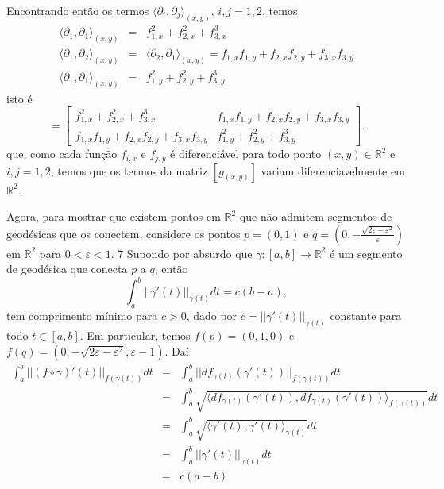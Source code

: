 \documentclass[twoside,openright,titlepage,numbers=noenddot,headinclude,  lineheaders footinclude=true,cleardoublepage=empty,BCOR=5mm,paper=a4,fontsize=12pt ]{scrbook}
\newcommand{\R}{\mathbb R}
\begin{document}
Encontrando então os termos $\langle \partial_i,\partial_j\rangle_{(x,y)}$, $i,j=1,2$, temos 
\begin{eqnarray*}
    \langle \partial_1,\partial_1\rangle_{(x,y)} &=& f_{1,x}^2 + f_{2,x}^2 + f_{3,x}^3\\
    \langle \partial_1,\partial_2\rangle_{(x,y)} &=& \langle \partial_2,\partial_1\rangle_{(x,y)} = f_{1,x}f_{1,y} + f_{2,x}f_{2,y} + f_{3,x}f_{3,y}\\
    \langle \partial_1,\partial_1\rangle_{(x,y)} &=& f_{1,y}^2 + f_{2,y}^2 + f_{3,y}^3
\end{eqnarray*}
isto é 
\begin{equation*}
    [g_{(x,y)}] =
    \begin{bmatrix}
         f_{1,x}^2 + f_{2,x}^2 + f_{3,x}^3 & f_{1,x}f_{1,y} + f_{2,x}f_{2,y} + f_{3,x}f_{3,y}\\
         f_{1,x}f_{1,y} + f_{2,x}f_{2,y} + f_{3,x}f_{3,y} & f_{1,y}^2 + f_{2,y}^2 + f_{3,y}^3
    \end{bmatrix}. 
\end{equation*}
que, como cada função $f_{i,x}$ e $f_{j,y}$ é diferenciável para todo ponto $(x,y) \in \R^2$ e $i,j=1,2$, temos que os termos da matriz $[g_{(x,y)}]$ variam diferenciavelmente em $\R^2$.   

Agora, para mostrar que existem pontos em $\R^2$ que não admitem segmentos de geodésicas que os conectem, considere os pontos $p = (0,1)$ e $q=(0,-\frac{\sqrt{2\varepsilon - \varepsilon^2}}{\varepsilon})$ em $\R^2$ para $0<\varepsilon<1$. 
7
Supondo por absurdo que $\gamma:[a,b] \longrightarrow\R^2$ é um segmento de geodésica que conecta $p$ a $q$, então 
\begin{equation*}
    \int_{a}^b ||\gamma'(t)||_{\gamma(t)}dt = c(b-a),
\end{equation*}
tem comprimento mínimo para $c>0$, dado por $c = ||\gamma'(t)||_{\gamma(t)}$ constante para todo $t \in [a,b].$ Em particular, temos $f(p) = (0,1,0)$ e $f(q) = (0,-\sqrt{2\varepsilon - \varepsilon^2},\varepsilon-1).$ Daí 
\begin{eqnarray*}
    \int_{a}^b ||(f\circ \gamma)'(t)||_{f(\gamma(t))}dt &=& \int_{a}^b ||df_{\gamma(t)}(\gamma'(t))||_{f(\gamma(t))}dt\\
    &=& \int_{a}^b \sqrt{\langle df_{\gamma(t)}(\gamma'(t)),df_{\gamma(t)}(\gamma'(t))\rangle_{f(\gamma(t))}}dt\\
    &=&\int_a^b \sqrt{\langle \gamma'(t),\gamma'(t)\rangle_{\gamma(t)}}dt\\
    &=& \int_{a}^b ||\gamma'(t)||_{\gamma(t)}dt\\
    &=&c(a-b)
\end{eqnarray*}
\end{document}

